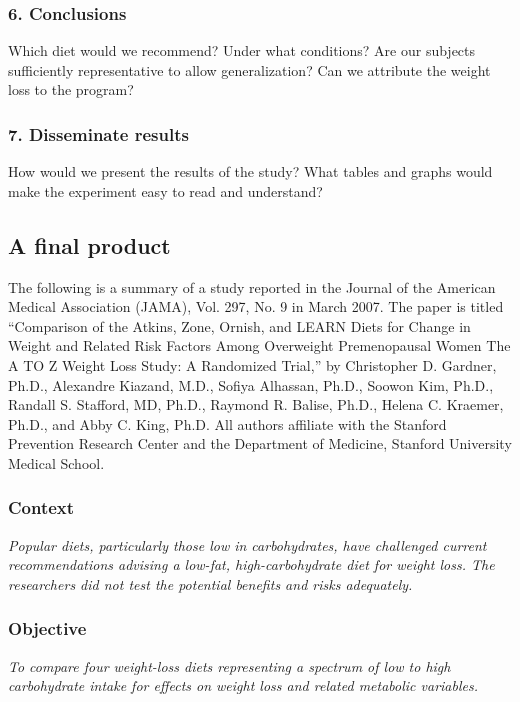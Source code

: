 \documentclass[11pt]{book}\usepackage[]{graphicx}\usepackage[]{color}
\begin{document}
\subsubsection{6.	Conclusions}

Which diet would we recommend?  Under what conditions? Are our subjects sufficiently representative to allow generalization?  Can we attribute the weight loss to the program?  

\subsubsection{7.	Disseminate results}

How would we present the results of the study?  What tables and graphs would make the experiment easy to read and understand?

\subsection{A final product}

The following is a summary of a study reported in the Journal of the American Medical Association (JAMA), Vol. 297, No. 9 in March 2007.  The paper is titled ``Comparison of the Atkins, Zone, Ornish, and LEARN Diets for Change in Weight and Related Risk Factors Among Overweight Premenopausal Women The A TO Z Weight Loss Study: A Randomized Trial,'' by Christopher D. Gardner, Ph.D., Alexandre Kiazand, M.D., Sofiya Alhassan, Ph.D., Soowon Kim, Ph.D., Randall S. Stafford, MD, Ph.D., Raymond R. Balise, Ph.D., Helena C. Kraemer, Ph.D., and Abby C. King, Ph.D.  All authors affiliate with the Stanford Prevention Research Center and the Department of Medicine, Stanford University Medical School.

\subsubsection{Context}

\textit{Popular diets, particularly those low in carbohydrates, have challenged current recommendations advising a low-fat, high-carbohydrate diet for weight loss. The researchers did not test the potential benefits and risks adequately.}

\subsubsection{Objective}

\textit{To compare four weight-loss diets representing a spectrum of low to high carbohydrate intake for effects on weight loss and related metabolic variables.}
\end{document}
